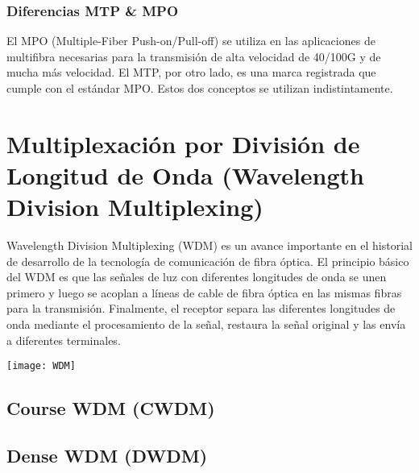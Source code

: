\subsubsection*{Diferencias MTP \& MPO}
El MPO (Multiple-Fiber Push-on/Pull-off) se utiliza en las aplicaciones de multifibra necesarias para la transmisión de alta velocidad de 40/100G y de mucha más velocidad. El MTP, por otro lado, es una marca registrada que cumple con el estándar MPO. Estos dos conceptos se utilizan indistintamente.

\section{Multiplexación por División de Longitud de Onda (Wavelength Division Multiplexing)}
Wavelength Division Multiplexing (WDM) es un avance importante en el historial de desarrollo de la tecnología de comunicación de fibra óptica. El principio básico del WDM es que las señales de luz con diferentes longitudes de onda se unen primero y luego se acoplan a líneas de cable de fibra óptica en las mismas fibras para la transmisión. Finalmente, el receptor separa las diferentes longitudes de onda mediante el procesamiento de la señal, restaura la señal original y las envía a diferentes terminales.
\begin{center}
\texttt{[image: WDM]}
\end{center}
\subsection{Course WDM (CWDM)}
\subsection{Dense WDM (DWDM)}





